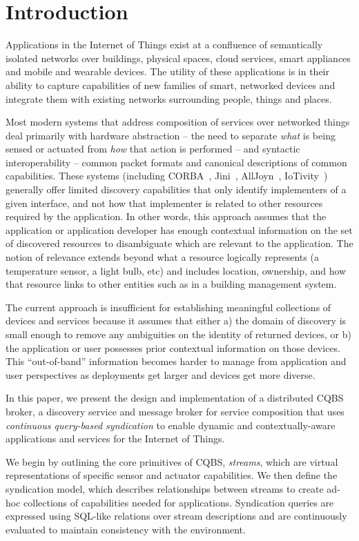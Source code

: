 \section{Introduction}
Applications in the Internet of Things exist at a confluence of semantically isolated networks over buildings, physical spaces, cloud services, smart appliances and mobile and wearable devices. 
The utility of these applications is in their ability to capture capabilities of new families of smart, networked devices and integrate them with existing networks surrounding people, things and places.

Most modern systems that address composition of services over networked things deal primarily with hardware abstraction -- the need to separate \emph{what} is being sensed or actuated from \emph{how} that action is performed -- and syntactic interoperability -- common packet formats and canonical descriptions of common capabilities. 
These systems (including CORBA~\cite{vinoski1997corba}, Jini~\cite{waldo1999jini}, AllJoyn~\cite{alljoyn}, IoTivity~\cite{iotivity}) generally offer limited discovery capabilities that only identify implementers of a given interface, and not how that implementer is related to other resources required by the application. 
In other words, this approach assumes that the application or application developer has enough contextual information on the set of discovered resources to disambiguate which are relevant to the application. 
The notion of relevance extends beyond what a resource logically represents (a temperature sensor, a light bulb, etc) and includes location, ownership, and how that resource links to other entities such as in a building management system.

The current approach is insufficient for establishing meaningful collections of devices and services because it assumes that either a) the domain of discovery is small enough to remove any ambiguities on the identity of returned devices, or b) the application or user possesses prior contextual information on those devices.  
This ``out-of-band'' information becomes harder to manage from application and user perspectives as deployments get larger and devices get more diverse.

In this paper, we present the design and implementation of a distributed CQBS broker, a discovery service and message broker for service composition that uses \emph{continuous query-based syndication} to enable dynamic and contextually-aware applications and services for the Internet of Things. 

We begin by outlining the core
primitives of CQBS, \emph{streams}, which are virtual representations of
specific sensor and actuator capabilities.  
We then define the syndication
model, which describes relationships between streams to create ad-hoc
collections of capabilities needed for applications. 
Syndication queries are
expressed using SQL-like relations over stream descriptions and are
continuously evaluated to maintain consistency with the environment.  


